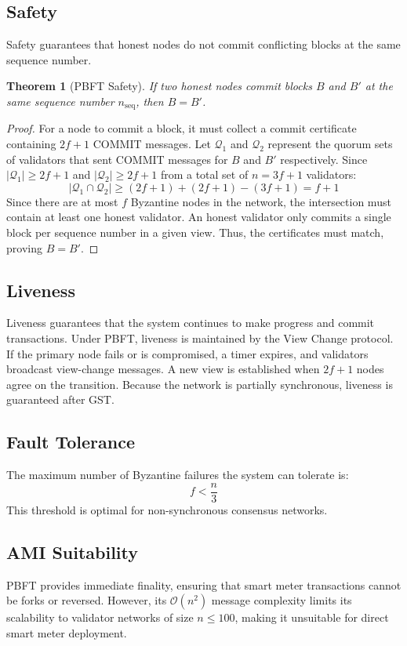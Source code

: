 \documentclass[12pt, oneside, a4paper]{report}
\newtheorem{theorem}{Theorem}[chapter]
\theoremstyle{definition}
\theoremstyle{remark}
\begin{document}
\subsection{Safety}
Safety guarantees that honest nodes do not commit conflicting blocks at the same sequence number.
\begin{theorem}[PBFT Safety]
If two honest nodes commit blocks $B$ and $B'$ at the same sequence number $n_{\mathrm{seq}}$, then $B = B'$.
\end{theorem}
\begin{proof}
For a node to commit a block, it must collect a commit certificate containing $2f+1$ COMMIT messages. Let $\mathcal{Q}_1$ and $\mathcal{Q}_2$ represent the quorum sets of validators that sent COMMIT messages for $B$ and $B'$ respectively. Since $|\mathcal{Q}_1| \ge 2f+1$ and $|\mathcal{Q}_2| \ge 2f+1$ from a total set of $n = 3f+1$ validators:
\begin{equation}
|\mathcal{Q}_1 \cap \mathcal{Q}_2| \ge (2f+1) + (2f+1) - (3f+1) = f+1
\end{equation}
Since there are at most $f$ Byzantine nodes in the network, the intersection must contain at least one honest validator. An honest validator only commits a single block per sequence number in a given view. Thus, the certificates must match, proving $B = B'$.
\end{proof}

\subsection{Liveness}
Liveness guarantees that the system continues to make progress and commit transactions. Under PBFT, liveness is maintained by the View Change protocol. If the primary node fails or is compromised, a timer expires, and validators broadcast view-change messages. A new view is established when $2f+1$ nodes agree on the transition. Because the network is partially synchronous, liveness is guaranteed after GST.

\subsection{Fault Tolerance}
The maximum number of Byzantine failures the system can tolerate is:
\begin{equation}
f < \frac{n}{3}
\end{equation}
This threshold is optimal for non-synchronous consensus networks.

\subsection{AMI Suitability}
PBFT provides immediate finality, ensuring that smart meter transactions cannot be forks or reversed. However, its $\mathcal{O}(n^2)$ message complexity limits its scalability to validator networks of size $n \le 100$, making it unsuitable for direct smart meter deployment.
\end{document}
